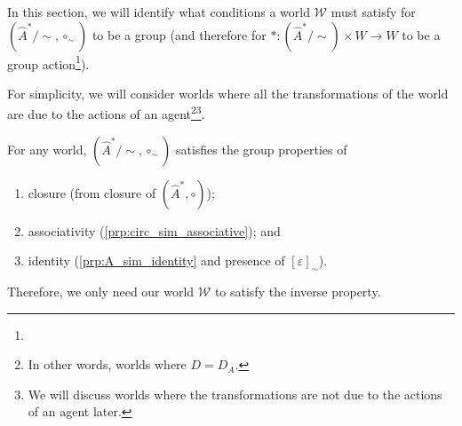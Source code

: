 In this section, we will identify what conditions a world $\mathscr{W}$ must satisfy for $(\hat{A}^{*}/\sim, \circ_{\sim})$ to be a group (and therefore for $\ast: (\hat{A}^{*}/\sim) \times W \to W$ to be a group action\footnote{
}).

For simplicity, we will consider worlds where all the transformations of the world are due to the actions of an agent\footnote{In other words, worlds where $D = D_{A}$.}\footnote{We will discuss worlds where the transformations are not due to the actions of an agent later.}.

For any world, $(\hat{A}^{*}/\sim, \circ_{\sim})$ satisfies the group properties of
\begin{enumerate}
    \item closure (from closure of $(\hat{A}^{*}, \circ)$);
    \item associativity (\cref{prp:circ_sim_associative}); and
    \item identity (\cref{prp:A_sim_identity} and presence of $[\varepsilon]_{\sim}$).
\end{enumerate}

Therefore, we only need our world $\mathscr{W}$ to satisfy the inverse property.

